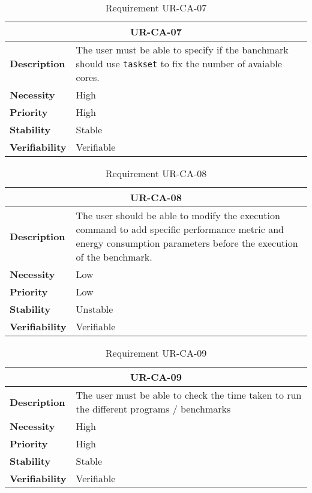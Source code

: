 \begin{table}[H]
    \centering
    \begin{tabular}{l p{10cm}}
        \toprule
        \multicolumn{2}{c}{UR-CA-07} \\
        \toprule
        \textbf{Description}        & The user must be able to specify if the banchmark should use \texttt{taskset} to fix the number of avaiable cores.\\
        \textbf{Necessity}          & High   \\
        \textbf{Priority}           & High   \\
        \textbf{Stability}          & Stable \\
        \textbf{Verifiability}      & Verifiable \\
    \end{tabular}
    \caption{Requirement UR-CA-07}
    \label{tab:ur-ca-07}
\end{table}

\begin{table}[H]
    \centering
    \begin{tabular}{l p{10cm}}
        \toprule
        \multicolumn{2}{c}{UR-CA-08} \\
        \toprule
        \textbf{Description}        & The user should be able to modify the execution command to add specific performance metric and energy consumption parameters before the execution of the benchmark. \\
        \textbf{Necessity}          & Low   \\
        \textbf{Priority}           & Low   \\
        \textbf{Stability}          & Unstable \\
        \textbf{Verifiability}      & Verifiable \\
    \end{tabular}
    \caption{Requirement UR-CA-08}
    \label{tab:ur-ca-08}
\end{table}

\begin{table}[H]
    \centering
    \begin{tabular}{l p{10cm}}
        \toprule
        \multicolumn{2}{c}{UR-CA-09} \\
        \toprule
        \textbf{Description}        & The user must be able to check the time taken to run the different programs / benchmarks \\
        \textbf{Necessity}          & High   \\
        \textbf{Priority}           & High   \\
        \textbf{Stability}          & Stable \\
        \textbf{Verifiability}      & Verifiable \\
    \end{tabular}
    \caption{Requirement UR-CA-09}
    \label{tab:ur-ca-09}
\end{table}

